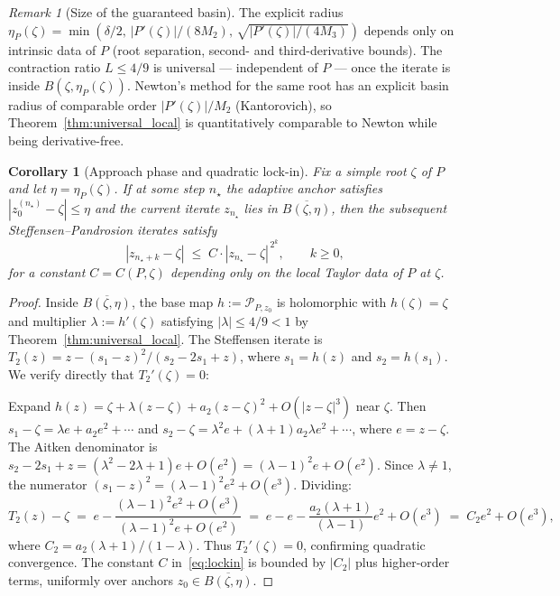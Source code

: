\documentclass[10pt,a4paper,oneside]{book}
\newtheorem{corollary}[theorem]{Corollary}
\theoremstyle{definition}
\theoremstyle{remark}
\newtheorem{remark}[theorem]{Remark}
\begin{document}
\begin{remark}[Size of the guaranteed basin]
The explicit radius $\eta_P(\zeta) = \min(\delta/2,\, |P'(\zeta)|/(8M_2),\, \sqrt{|P'(\zeta)|/(4M_3)})$ depends only on intrinsic data of $P$ (root separation, second- and third-derivative bounds).  The contraction ratio $L \leq 4/9$ is universal --- independent of $P$ --- once the iterate is inside $B(\zeta, \eta_P(\zeta))$.  Newton's method for the same root has an explicit basin radius of comparable order $|P'(\zeta)|/M_2$ (Kantorovich), so Theorem~\ref{thm:universal_local} is quantitatively comparable to Newton while being derivative-free.
\end{remark}

\begin{corollary}[Approach phase and quadratic lock-in]
\label{cor:lockin}
Fix a simple root $\zeta$ of $P$ and let $\eta = \eta_P(\zeta)$.  If at some step $n_\star$ the adaptive anchor satisfies $|z_0^{(n_\star)} - \zeta| \leq \eta$ and the current iterate $z_{n_\star}$ lies in $\overline{B(\zeta, \eta)}$, then the subsequent Steffensen--Pandrosion iterates satisfy
\begin{equation}
  \label{eq:lockin}
  |z_{n_\star + k} - \zeta| \;\leq\; C\cdot|z_{n_\star} - \zeta|^{\,2^k}, \qquad k \geq 0,
\end{equation}
for a constant $C = C(P, \zeta)$ depending only on the local Taylor data of $P$ at $\zeta$.
\end{corollary}

\begin{proof}
Inside $\overline{B(\zeta,\eta)}$, the base map $h := \mathcal{P}_{P,z_0}$ is holomorphic with $h(\zeta) = \zeta$ and multiplier $\lambda := h'(\zeta)$ satisfying $|\lambda| \leq 4/9 < 1$ by Theorem~\ref{thm:universal_local}.  The Steffensen iterate is $T_2(z) = z - (s_1 - z)^2/(s_2 - 2s_1 + z)$, where $s_1 = h(z)$ and $s_2 = h(s_1)$.  We verify directly that $T_2'(\zeta) = 0$:

Expand $h(z) = \zeta + \lambda(z - \zeta) + a_2(z-\zeta)^2 + O(|z-\zeta|^3)$ near $\zeta$.  Then $s_1 - \zeta = \lambda e + a_2 e^2 + \cdots$ and $s_2 - \zeta = \lambda^2 e + (\lambda + 1) a_2 \lambda e^2 + \cdots$, where $e = z - \zeta$.  The Aitken denominator is $s_2 - 2s_1 + z = (\lambda^2 - 2\lambda + 1)e + O(e^2) = (\lambda - 1)^2 e + O(e^2)$.  Since $\lambda \neq 1$, the numerator $(s_1 - z)^2 = (\lambda - 1)^2 e^2 + O(e^3)$.  Dividing:
\[
  T_2(z) - \zeta \;=\; e - \frac{(\lambda - 1)^2 e^2 + O(e^3)}{(\lambda-1)^2 e + O(e^2)} \;=\; e - e - \frac{a_2(\lambda+1)}{(\lambda - 1)} e^2 + O(e^3) \;=\; C_2 e^2 + O(e^3),
\]
where $C_2 = a_2(\lambda+1)/(1-\lambda)$.  Thus $T_2'(\zeta) = 0$, confirming quadratic convergence.  The constant $C$ in~\eqref{eq:lockin} is bounded by $|C_2|$ plus higher-order terms, uniformly over anchors $z_0 \in \overline{B(\zeta, \eta)}$.
\end{proof}
\end{document}
